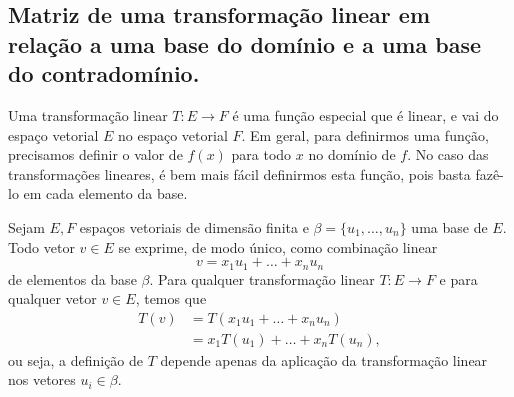 \subsection{Matriz de uma transformação linear em relação a uma base do domínio e a uma base do contradomínio.}

Uma transformação linear $T:E\rightarrow F$ é uma função especial que é linear, e vai do espaço vetorial $E$ no espaço vetorial $F$. Em geral, para definirmos uma função, precisamos definir o valor de $f(x)$ para todo $x$ no domínio de $f$. No caso das transformações lineares, é bem mais fácil definirmos esta função, pois basta fazê-lo em cada elemento da base.

Sejam $E,F$ espaços vetoriais de dimensão finita e $\beta=\{u_1,\dots,u_n\}$ uma base de $E$. Todo vetor $v\in E$ se exprime, de modo único, como combinação linear
\begin{equation*}
  v=x_1u_1+\ldots+x_nu_n
\end{equation*}
de elementos da base $\beta$. Para qualquer transformação linear $T:E\rightarrow F$ e para qualquer vetor $v\in E$, temos que 
\begin{align*}
  T(v) &= T(x_1u_1+\ldots+x_nu_n)\\
  &= x_1 T(u_1) + \ldots + x_nT(u_n),
\end{align*}
ou seja, a definição de $T$ depende apenas da aplicação da transformação linear nos vetores $u_i\in \beta$. 

